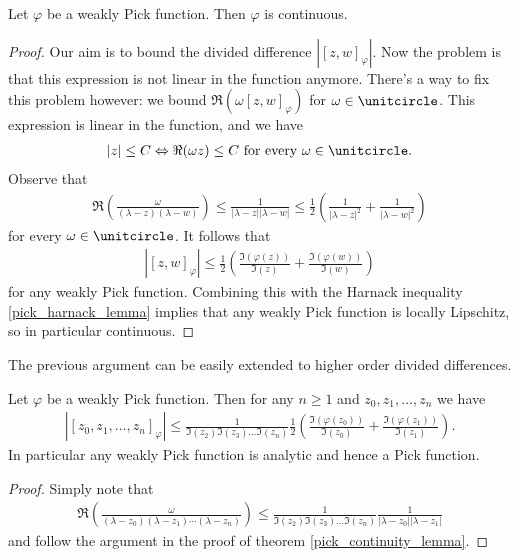 \begin{lause}\label{pick_continuity_lemma}
	Let $\varphi$ be a weakly Pick function. Then $\varphi$ is continuous.
\end{lause}
\begin{proof}
	Our aim is to bound the divided difference $|[z, w]_{\varphi}|$. Now the problem is that this expression is not linear in the function anymore. There's a way to fix this problem however: we bound $\Re(\omega [z, w]_{\varphi})$ for $\omega \in \unitcircle$. This expression is linear in the function, and we have
	\begin{align*}
		|z| \leq C \Leftrightarrow \Re(\omega z) \leq C \text{ for every $\omega \in \unitcircle$}.
	\end{align*}
	Observe that
	\begin{align*}
		\Re\left(\frac{\omega}{(\lambda - z)(\lambda - w)} \right) \leq \frac{1}{|\lambda - z||\lambda - w|} \leq \frac{1}{2} \left( \frac{1}{|\lambda - z|^2} + \frac{1}{|\lambda - w|^2}\right)
	\end{align*}
	for every $\omega \in \unitcircle$. It follows that
	\begin{align*}
		|[z, w]_{\varphi}| \leq \frac{1}{2} \left(\frac{\Im(\varphi(z))}{\Im(z)} + \frac{\Im(\varphi(w))}{\Im(w)}\right)
	\end{align*}
	for any weakly Pick function. Combining this with the Harnack inequality \ref{pick_harnack_lemma} implies that any weakly Pick function is locally Lipschitz, so in particular continuous.
\end{proof}

The previous argument can be easily extended to higher order divided differences.

\begin{lause}\label{Hindmarsh_theorem}
	Let $\varphi$ be a weakly Pick function. Then for any $n \geq 1$ and $z_{0}, z_{1}, \ldots, z_{n}$ we have
	\begin{align*}
		|[z_{0}, z_{1}, \ldots, z_{n}]_{\varphi}| \leq \frac{1}{\Im(z_{2}) \Im(z_{3}) \ldots \Im(z_{n})} \frac{1}{2}\left(\frac{\Im(\varphi(z_{0}))}{\Im(z_{0})} + \frac{\Im(\varphi(z_{1}))}{\Im(z_{1})}\right).
	\end{align*}
	In particular any weakly Pick function is analytic and hence a Pick function.
\end{lause}
\begin{proof}
	Simply note that
	\begin{align*}
		\Re\left(\frac{\omega}{(\lambda - z_{0})(\lambda - z_{1}) \cdots (\lambda - z_{n})} \right) \leq \frac{1}{\Im(z_{2}) \Im(z_{3}) \ldots \Im(z_{n})} \frac{1}{|\lambda - z_{0}||\lambda - z_{1}|}
	\end{align*}
	and follow the argument in the proof of theorem \ref{pick_continuity_lemma}.
\end{proof}

